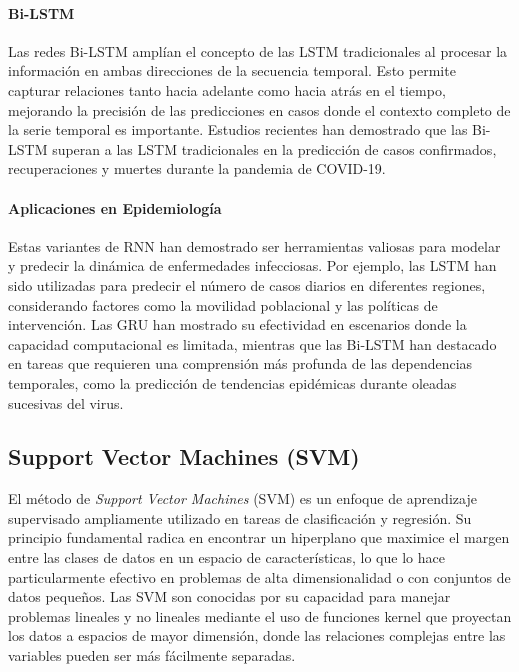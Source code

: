 \paragraph{Bi-LSTM}
Las redes Bi-LSTM amplían el concepto de las LSTM tradicionales al procesar la información en ambas direcciones de la secuencia temporal. Esto permite capturar relaciones tanto hacia adelante como hacia atrás en el tiempo, mejorando la precisión de las predicciones en casos donde el contexto completo de la serie temporal es importante. Estudios recientes han demostrado que las Bi-LSTM superan a las LSTM tradicionales en la predicción de casos confirmados, recuperaciones y muertes durante la pandemia de COVID-19\parencite{Shah2024COVID19FU, Baccega2024Sybil}.

\paragraph{Aplicaciones en Epidemiología}
Estas variantes de RNN han demostrado ser herramientas valiosas para modelar y predecir la dinámica de enfermedades infecciosas. Por ejemplo, las LSTM han sido utilizadas para predecir el número de casos diarios en diferentes regiones, considerando factores como la movilidad poblacional y las políticas de intervención\parencite{Rodriguez2022DataCentric}. Las GRU han mostrado su efectividad en escenarios donde la capacidad computacional es limitada, mientras que las Bi-LSTM han destacado en tareas que requieren una comprensión más profunda de las dependencias temporales, como la predicción de tendencias epidémicas durante oleadas sucesivas del virus\parencite{Nguyen2023NZSTGNN, Baccega2024Sybil}.

\subsection{Support Vector Machines (SVM)}

El método de \textit{Support Vector Machines} (SVM) es un enfoque de aprendizaje supervisado ampliamente utilizado en tareas de clasificación y regresión. Su principio fundamental radica en encontrar un hiperplano que maximice el margen entre las clases de datos en un espacio de características, lo que lo hace particularmente efectivo en problemas de alta dimensionalidad o con conjuntos de datos pequeños\parencite{Santangelo2023MachineLearning}. Las SVM son conocidas por su capacidad para manejar problemas lineales y no lineales mediante el uso de funciones kernel que proyectan los datos a espacios de mayor dimensión, donde las relaciones complejas entre las variables pueden ser más fácilmente separadas\parencite{Stergiou2022MachineLearning}.

